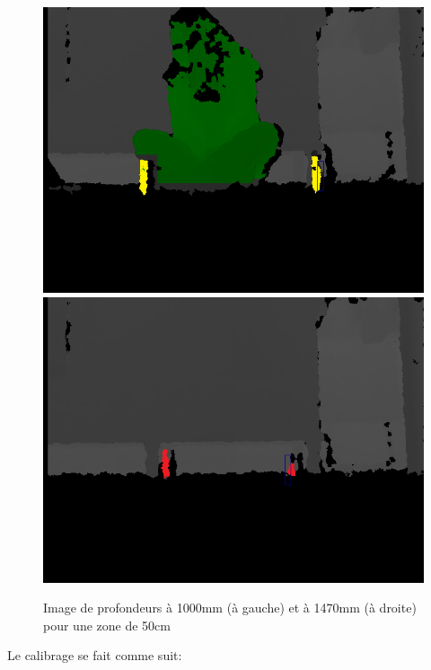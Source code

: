 \documentclass[12pt,a4paper,oneside]{book}
\begin{document}
	\begin{figure}[H]
		\centering
		\includegraphics[scale=0.45]{images/simuler.png}
		\includegraphics[scale=0.45]{images/i6.png}
		\caption{Image de profondeurs à 1000mm (à gauche) et à 1470mm (à droite) pour une zone de 50cm}
		\label{fig1m}
	\end{figure}
	
	Le calibrage se fait comme suit:
	
\end{document}

